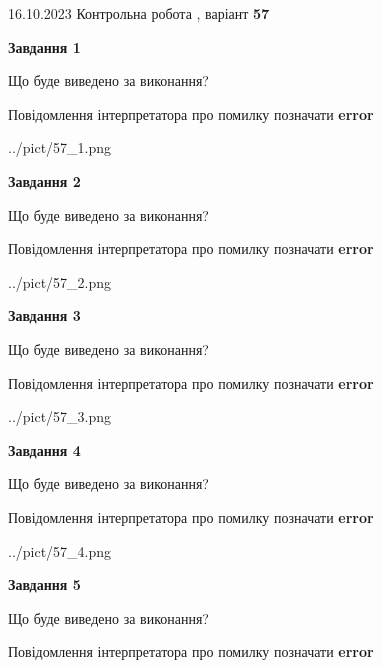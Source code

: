 \documentclass[12pt, ukrainian]{article}
\begin{document}
{\Large{16.10.2023 Контрольна робота , варіант  \No \textbf { 57 }\par}}
{
\begin {large}
{\begin {center}\textbf{Завдання 1}\end {center}}\par
Що буде виведено за виконання? \par
Повідомлення інтерпретатора про помилку позначати \textbf{error}

\begin{center}
	{../pict/57_1.png}
\end{center}
\newpage

{\begin {center}\textbf{Завдання 2}\end {center}}\par
Що буде виведено за виконання? \par
Повідомлення інтерпретатора про помилку позначати \textbf{error}

\begin{center}
	{../pict/57_2.png}
\end{center}
\newpage

{\begin {center}\textbf{Завдання 3}\end {center}}\par
Що буде виведено за виконання? \par
Повідомлення інтерпретатора про помилку позначати \textbf{error}

\begin{center}
	{../pict/57_3.png}
\end{center}
\newpage

{\begin {center}\textbf{Завдання 4}\end {center}}\par
Що буде виведено за виконання? \par
Повідомлення інтерпретатора про помилку позначати \textbf{error}

\begin{center}
	{../pict/57_4.png}
\end{center}
\newpage

{\begin {center}\textbf{Завдання 5}\end {center}}\par
Що буде виведено за виконання? \par
Повідомлення інтерпретатора про помилку позначати \textbf{error}


\end{large}}
\end{document}
